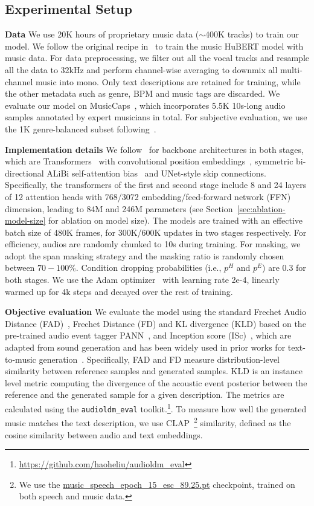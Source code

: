 \subsection{Experimental Setup}
\textbf{Data}
We use 20K hours of proprietary music data ($\sim$400K tracks) to train our model. We follow the original recipe in~\cite{Hsu2021HuBERTSS} to train the music HuBERT model with music data. For data preprocessing, we filter out all the vocal tracks and resample all the data to 32kHz and perform channel-wise averaging to downmix all multi-channel music into mono. Only text descriptions are retained for training, while the other metadata such as genre, BPM and music tags are discarded.
We evaluate our model on MusicCaps~\cite{musiclm}, which incorporates 5.5K
10s-long audio samples annotated by expert musicians in total. For subjective evaluation, we use the 1K genre-balanced subset following~\cite{musiclm}.

\textbf{Implementation details} We follow~\cite{Le2023VoiceboxTM} for backbone architectures in both stages, which are Transformers~\cite{Vaswani2017AttentionIA} with convolutional position
embeddings~\cite{Baevski2020wav2vec2A}, symmetric bi-directional ALiBi self-attention bias~\cite{Press2021TrainST} and UNet-style skip connections. Specifically, the transformers of the first and second stage include 8 and 24 layers of 12 attention heads with 768/3072 embedding/feed-forward network (FFN) dimension, leading to 84M and 246M
parameters (see Section~\ref{sec:ablation-model-size} for ablation on model size). 
The models are trained with an effective batch size of 480K frames, for 300K/600K updates in two stages respectively. For efficiency, audios
are randomly chunked to 10s during training. For masking, we adopt the span masking strategy and the masking ratio is randomly chosen between $70-100\%$. Condition dropping probabilities (i.e., $p^H$ and $p^E$) are 0.3 for both stages. 
We use the Adam optimizer~\cite{kingma2014adam} with learning rate 2e-4, linearly warmed up for 4k steps
and decayed over the rest of training. 

\textbf{Objective evaluation} We evaluate the model using the standard Frechet Audio Distance (FAD)~\citep{Kilgour2019FrchetAD}, Frechet Distance (FD) and KL divergence (KLD) based on the pre-trained audio event tagger PANN~\citep{Kong2019PANNsLP}, and Inception score (ISc)~\citep{Salimans2016ImprovedTF}, which are adapted from sound generation and has been widely used in prior works for text-to-music generation~\cite{musiclm,noise2music,musicgen,jen1}.
Specifically, FAD and FD measure distribution-level similarity between reference samples and generated samples. KLD is an instance level metric computing the divergence of the acoustic event posterior between the reference and the generated sample for a given description. 
The metrics are calculated using the \texttt{audioldm\_eval} toolkit.\footnote{\url{https://github.com/haoheliu/audioldm_eval}}. 
To measure how well the generated music matches the text description, we use CLAP~\footnote{We use the \url{music_speech_epoch_15_esc_89.25.pt} checkpoint, trained on both speech and music data.} similarity, defined as the cosine similarity between audio and text embeddings.

